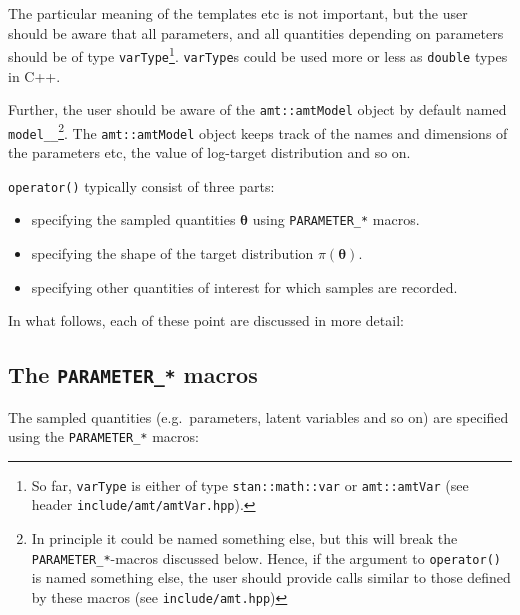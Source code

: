 \documentclass[
]{book}
\providecommand{\tightlist}{%
  \setlength{\itemsep}{0pt}\setlength{\parskip}{0pt}}
\begin{document}
The particular meaning of the templates etc is not important, but the
user should be aware that all parameters, and all quantities depending
on parameters should be of type \texttt{varType}\footnote{So far, \texttt{varType} is either of type \texttt{stan::math::var} or \texttt{amt::amtVar} (see header \texttt{include/amt/amtVar.hpp}).}. \texttt{varType}s could be used more
or less as \texttt{double} types in C++.

Further, the user should be aware of the \texttt{amt::amtModel} object by default named \texttt{model\_\_}\footnote{In principle it could be named something else, but this will break the \texttt{PARAMETER\_*}-macros discussed below. Hence, if the argument to \texttt{operator()} is named something else, the user should provide calls similar to those defined by these macros (see \texttt{include/amt.hpp})}. The \texttt{amt::amtModel} object keeps track of the names and dimensions of the parameters etc, the value of log-target distribution and so on.

\texttt{operator()} typically consist of three parts:

\begin{itemize}
\tightlist
\item
  specifying the sampled quantities \(\boldsymbol \theta\) using \texttt{PARAMETER\_*} macros.
\item
  specifying the shape of the target distribution \(\pi(\boldsymbol \theta)\).
\item
  specifying other quantities of interest for which samples are recorded.
\end{itemize}

In what follows, each of these point are discussed in more detail:

\hypertarget{the-parameter_-macros}{%
\subsection{\texorpdfstring{The \texttt{PARAMETER\_*} macros}{The PARAMETER\_* macros}}\label{the-parameter_-macros}}

The sampled quantities (e.g.~parameters, latent variables and so on) are specified using the \texttt{PARAMETER\_*} macros:
\end{document}
